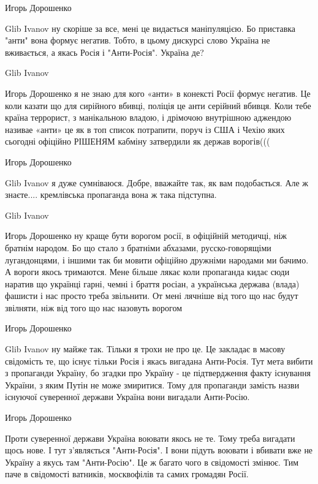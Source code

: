 Игорь Дорошенко

Glib Ivanov ну скоріше за все, мені це видається маніпуляцією. Бо приставка
"анти" вона формує негатив. Тобто, в цьому дискурсі слово Україна не
вживається, а якась Росія і "Анти-Росія". Україна де?

Glib Ivanov

Игорь Дорошенко я не знаю для кого «анти» в конексті Росії формує негатив. Це
коли казати що для сирійного вбивці, поліція це анти серійний вбивця. Коли тебе
країна террорист, з манікальною владою, і дрімочою внутрішною аджендою називае
«анти» це як в топ список потрапити, поруч із США і Чехію яких сьогодні
офіційно РІШЕНЯМ кабміну затвердили як держав ворогів(((

Игорь Дорошенко

Glib Ivanov я дуже сумніваюся. Добре, вважайте так, як вам подобається. Але ж
знаєте.... кремлівська пропаганда вона ж така підступна.

Glib Ivanov

Игорь Дорошенко ну краще бути ворогом росії, в офіційній методичці, ніж братнім
народом. Бо що стало з братніми абхазами, русско-говорящіми лугандонцями, і
іншими так би мовити офіційно дружніми народами ми бачимо. А вороги якось
тримаются. Мене більше лякає коли пропаганда кидає сюди наратив що українці
гарні, чемні і браття росіан, а українська держава (влада) фашисти і нас просто
треба звільнити. От мені лячніше від того що нас будут звілняти, ніж від того
що нас назовуть ворогом

Игорь Дорошенко

Glib Ivanov ну майже так. Тільки я трохи не про це. Це закладає в масову
свідомість те, що існує тільки Росія і якась вигадана Анти-Росія. Тут мета
вибити з пропаганди Україну, бо згадки про Україну - це підтвердження факту
існування України, з яким Путін не може змиритися. Тому для пропаганди замість
назви існуючої суверенної держави Україна вони вигадали Анти-Росію.

Игорь Дорошенко

Проти суверенної держави Україна воювати якось не те. Тому треба вигадати щось нове. І тут з'являється "Анти-Росія". І вони підуть воювати і вбивати вже не Україну а якусь там "Анти-Росію". Це ж багато чого в свідомості змінює. Тим паче в свідомості ватників, москвофілів та самих громадян Росії.
